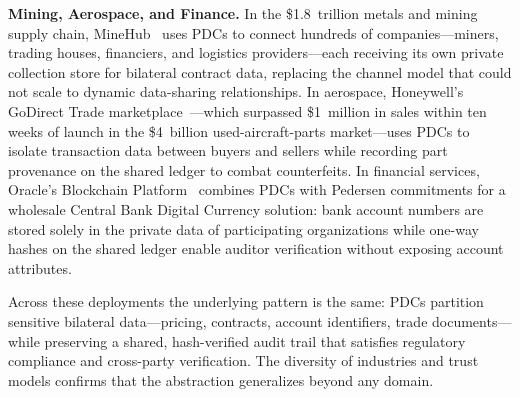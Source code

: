 \textbf{Mining, Aerospace, and Finance.}
In the \$1.8~trillion metals and mining supply chain, MineHub~\cite{minehub} uses PDCs to connect hundreds of companies---miners, trading houses, financiers, and logistics providers---each receiving its own private collection store for bilateral contract data, replacing the channel model that could not scale to dynamic data-sharing relationships. In aerospace, Honeywell's GoDirect Trade marketplace~\cite{honeywell}---which surpassed \$1~million in sales within ten weeks of launch in the \$4~billion used-aircraft-parts market---uses PDCs to isolate transaction data between buyers and sellers while recording part provenance on the shared ledger to combat counterfeits. In financial services, Oracle's Blockchain Platform~\cite{oracle-cbdc} combines PDCs with Pedersen commitments for a wholesale Central Bank Digital Currency solution: bank account numbers are stored solely in the private data of participating organizations while one-way hashes on the shared ledger enable auditor verification without exposing account attributes.

Across these deployments the underlying pattern is the same: PDCs partition sensitive bilateral data---pricing, contracts, account identifiers, trade documents---while preserving a shared, hash-verified audit trail that satisfies regulatory compliance and cross-party verification. The diversity of industries and trust models confirms that the abstraction generalizes beyond any domain.
